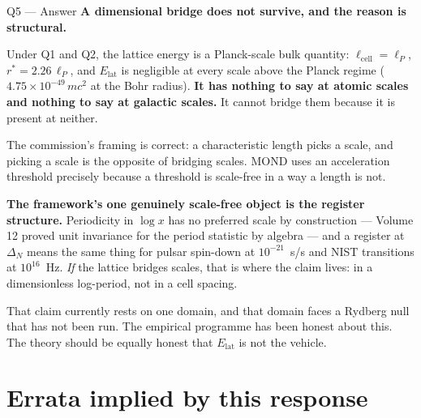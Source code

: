 \documentclass[11pt,letterpaper]{article}
\newcommand{\lcell}{\ell_{\mathrm{cell}}}
\newcommand{\lP}{\ell_{P}}
\begin{document}
\begin{answerbox}{Q5 --- Answer}
\textbf{A dimensional bridge does not survive, and the reason is structural.}

\medskip
Under Q1 and Q2, the lattice energy is a Planck-scale bulk quantity: $\lcell = \lP$,
$r^* = 2.26\,\lP$, and $E_{\mathrm{lat}}$ is negligible at every scale above the Planck
regime ($4.75\times10^{-49}\,mc^2$ at the Bohr radius). \textbf{It has nothing to say at
atomic scales and nothing to say at galactic scales.} It cannot bridge them because it is
present at neither.

\medskip
The commission's framing is correct: a characteristic length picks a scale, and picking a
scale is the opposite of bridging scales. MOND uses an acceleration threshold precisely
because a threshold is scale-free in a way a length is not.

\medskip
\textbf{The framework's one genuinely scale-free object is the register structure.}
Periodicity in $\log x$ has no preferred scale by construction --- Volume 12 proved unit
invariance for the period statistic by algebra --- and a register at $\Delta_N$ means the
same thing for pulsar spin-down at $10^{-21}$~s/s and NIST transitions at $10^{16}$~Hz.
\emph{If} the lattice bridges scales, that is where the claim lives: in a dimensionless
log-period, not in a cell spacing.

\medskip
That claim currently rests on one domain, and that domain faces a Rydberg null that has not
been run. The empirical programme has been honest about this. The theory should be equally
honest that $E_{\mathrm{lat}}$ is not the vehicle.
\end{answerbox}

\section{Errata implied by this response}
\end{document}
